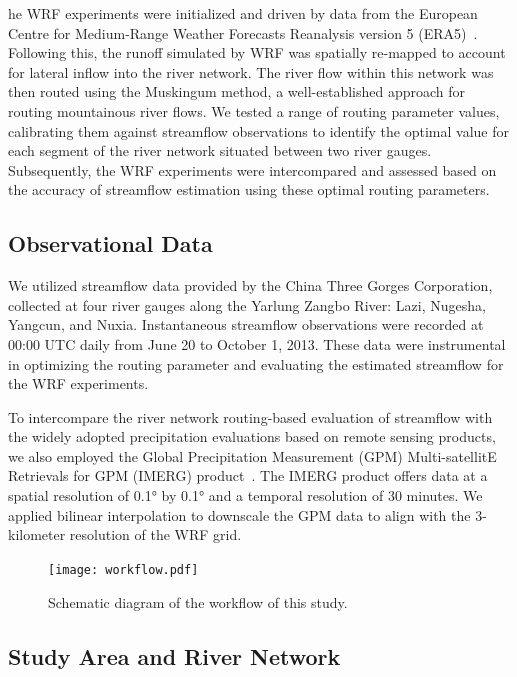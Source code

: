 \documentclass[draft]{agujournal2019}
\begin{document}
he WRF experiments were initialized and driven by data from the European Centre for Medium-Range Weather Forecasts Reanalysis version 5 (ERA5)~\cite{hersbach2020QJRMS}. Following this, the runoff simulated by WRF was spatially re-mapped to account for lateral inflow into the river network. The river flow within this network was then routed using the Muskingum method, a well-established approach for routing mountainous river flows. We tested a range of routing parameter values, calibrating them against streamflow observations to identify the optimal value for each segment of the river network situated between two river gauges. Subsequently, the WRF experiments were intercompared and assessed based on the accuracy of streamflow estimation using these optimal routing parameters.

\subsection{Observational Data}
\label{sec:data}

We utilized streamflow data provided by the China Three Gorges Corporation, collected at four river gauges along the Yarlung Zangbo River: Lazi, Nugesha, Yangcun, and Nuxia. Instantaneous streamflow observations were recorded at 00:00 UTC daily from June 20 to October 1, 2013. These data were instrumental in optimizing the routing parameter and evaluating the estimated streamflow for the WRF experiments.

To intercompare the river network routing-based evaluation of streamflow with the widely adopted precipitation evaluations based on remote sensing products, we also employed the Global Precipitation Measurement (GPM) Multi-satellitE Retrievals for GPM (IMERG) product~\cite{huffman2019GPM}. The IMERG product offers data at a spatial resolution of 0.1° by 0.1° and a temporal resolution of 30 minutes. We applied bilinear interpolation to downscale the GPM data to align with the 3-kilometer resolution of the WRF grid.

\begin{figure}[h!]
  \centering
  \noindent\texttt{[image: workflow.pdf]}
  \caption{Schematic diagram of the workflow of this study.}
  \label{fig:workflow}
\end{figure}

\subsection{Study Area and River Network}
\label{sec:domain}
\end{document}
